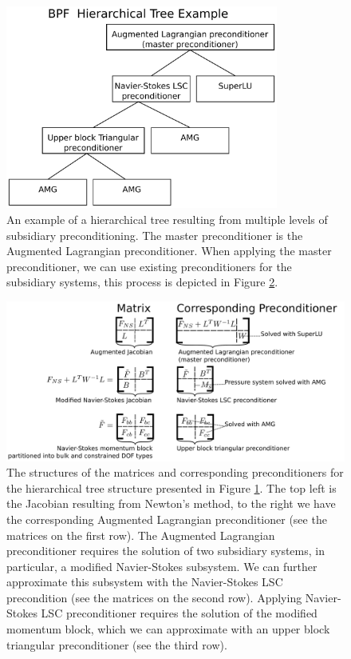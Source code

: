 \begin{figure}[H]
\centering
\includegraphics[width=0.8\textwidth]{./pic/bpf_hierarchy_tree_crop.pdf}
\caption{An example of a hierarchical tree resulting from multiple levels of
  subsidiary preconditioning. The master preconditioner is the Augmented
  Lagrangian preconditioner. When applying the master preconditioner, we can
  use existing preconditioners for the subsidiary systems, this process is
  depicted in Figure \ref{fig:bpf_hierarchy_matrixstructure_crop}.}
\label{fig:bpf_hierarchy_tree_crop}
\end{figure}

\begin{figure}[H]
\centering
\includegraphics[width=1\textwidth]{./pic/bpf_hierarchy_matrixstructure_crop.pdf}
\caption{The structures of the matrices and corresponding preconditioners for
  the hierarchical tree structure presented in Figure
  \ref{fig:bpf_hierarchy_tree_crop}. The top left is the Jacobian resulting
  from Newton's method, to the right we have the corresponding Augmented
  Lagrangian preconditioner (see the matrices on the first row). The Augmented
  Lagrangian preconditioner requires the solution of two subsidiary systems, in
  particular, a modified Navier-Stokes subsystem. We can further approximate
  this subsystem with the Navier-Stokes LSC precondition (see the matrices on
  the second row). Applying Navier-Stokes LSC preconditioner requires the
  solution of the modified momentum block, which we can approximate with an
  upper block triangular preconditioner (see the third row).}
\label{fig:bpf_hierarchy_matrixstructure_crop}
\end{figure}

